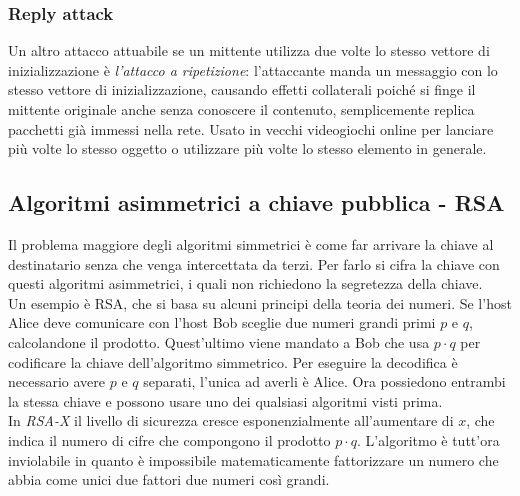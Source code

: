 \documentclass[10pt,a4paper,twoside]{article}
\begin{document}
\subsubsection{Reply attack}
Un altro attacco attuabile se un mittente utilizza due volte lo stesso vettore di inizializzazione è \textit{l'attacco a ripetizione}: l'attaccante manda un messaggio con lo stesso vettore di inizializzazione, causando effetti collaterali poiché si finge il mittente originale anche senza conoscere il contenuto, semplicemente replica pacchetti già immessi nella rete. Usato in vecchi videogiochi online per lanciare più volte lo stesso oggetto o utilizzare più volte lo stesso elemento in generale.

\subsection{Algoritmi asimmetrici a chiave pubblica - RSA}
Il problema maggiore degli algoritmi simmetrici è come far arrivare la chiave al destinatario senza che venga intercettata da terzi. Per farlo si cifra la chiave con questi algoritmi asimmetrici, i quali non richiedono la segretezza della chiave.\\
Un esempio è RSA, che si basa su alcuni principi della teoria dei numeri. Se l'host Alice deve comunicare con l'host Bob sceglie due numeri grandi primi $p$ e $q$, calcolandone il prodotto. Quest'ultimo viene mandato a Bob che usa $p\cdot q$ per codificare la chiave dell'algoritmo simmetrico. Per eseguire la decodifica è necessario avere $p$ e $q$ separati, l'unica ad averli è Alice. Ora possiedono entrambi la stessa chiave e possono usare uno dei qualsiasi algoritmi visti prima.\\
In \textit{RSA-X} il livello di sicurezza cresce esponenzialmente all'aumentare di $x$, che indica il numero di cifre che compongono il prodotto $p\cdot q$. L'algoritmo è tutt'ora inviolabile in quanto è impossibile matematicamente fattorizzare un numero che abbia come unici due fattori due numeri così grandi.
\end{document}
